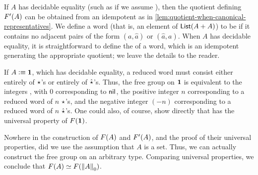 If $A$ has decidable equality (such as if we assume \LEM{}), then the quotient defining $\freegroupx{A}$ can be obtained from an idempotent as in \autoref{lem:quotient-when-canonical-representatives}.
We define a word (that is, an element of $\lst{A+A}$) to be  if it contains no adjacent pairs of the form $(a,\hat a)$ or $(\hat a,a)$.
When $A$ has decidable equality, it is straightforward to define the  of a word, which is an idempotent generating the appropriate quotient; we leave the details to the reader.

If $A\defeq \unit$, which has decidable equality, a reduced word must consist either entirely of $\ttt$'s or entirely of $\hat{\ttt}$'s.
Thus, the free group on $\unit$ is equivalent to the integers \Z, with $0$ corresponding to $\nil$, the positive integer $n$ corresponding to a reduced word of $n$ $\ttt$'s, and the negative integer $(-n)$ corresponding to a reduced word of $n$ $\hat{\ttt}$'s.
One could also, of course, show directly that \Z has the universal property of $\freegroup{\unit}$.

\begin{rmk}\label{thm:freegroup-nonset}
  Nowhere in the construction of $\freegroup{A}$ and $\freegroupx{A}$, and the proof of their universal properties, did we use the assumption that $A$ is a set.
  Thus, we can actually construct the free group on an arbitrary type.
  Comparing universal properties, we conclude that $\eqv{\freegroup{A}}{\freegroup{\trunc0A}}$.
\end{rmk}

